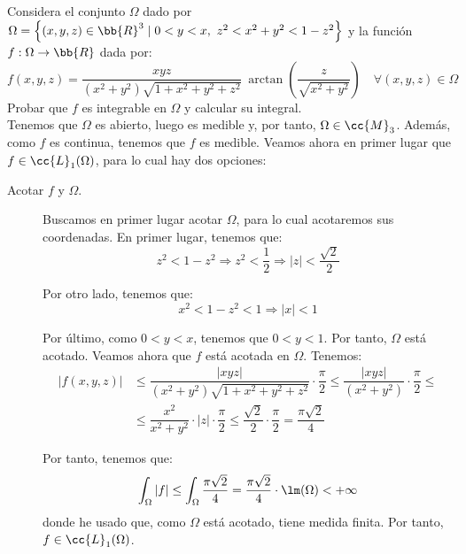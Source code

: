 \begin{ejercicio}
    Considera el conjunto $\Omega$ dado por $\Omega=\left\{(x,y,z)\in \bb{R}^3 \mid 0<y<x,~z^2<x^2+y^2<1-z^2\right\}$ y la función $f:\Omega\to \bb{R}$ dada por:
    \begin{equation*}
        f(x,y,z) = \dfrac{xyz}{(x^2+y^2)\sqrt{1+x^2+y^2+z^2}} ~\arctan\left(\dfrac{z}{\sqrt{x^2+y^2}}\right) \quad \forall (x,y,z)\in \Omega
    \end{equation*}
    Probar que $f$ es integrable en $\Omega$ y calcular su integral.\\

    Tenemos que $\Omega$ es abierto, luego es medible y, por tanto, $\Omega\in \cc{M}_3$. Además, como $f$ es continua, tenemos que $f$ es medible. Veamos ahora en primer lugar que $f\in \cc{L}_1(\Omega)$, para lo cual hay dos opciones:
    \begin{description}
        \item[Acotar $f$ y $\Omega$.]
        
        Buscamos en primer lugar acotar $\Omega$, para lo cual acotaremos sus coordenadas. En primer lugar, tenemos que:
        \begin{equation*}
            z^2<1-z^2\Longrightarrow z^2<\dfrac{1}{2}\Longrightarrow |z|<\dfrac{\sqrt{2}}{2}
        \end{equation*}

        Por otro lado, tenemos que:
        \begin{equation*}
            x^2<1-z^2<1\Longrightarrow |x|<1
        \end{equation*}

        Por último, como $0<y<x$, tenemos que $0<y<1$. Por tanto, $\Omega$ está acotado. Veamos ahora que $f$ está acotada en $\Omega$. Tenemos:
        \begin{align*}
            |f(x,y,z)| &\leq \dfrac{|xyz|}{(x^2+y^2)\sqrt{1+x^2+y^2+z^2}} \cdot \dfrac{\pi}{2} \leq \dfrac{|xyz|}{(x^2+y^2)}\cdot \dfrac{\pi}{2}
            \leq\\&\leq \dfrac{x^2}{x^2+y^2}\cdot |z| \cdot \dfrac{\pi}{2} \leq \dfrac{\sqrt{2}}{2}\cdot \dfrac{\pi}{2} = \dfrac{\pi\sqrt{2}}{4}
        \end{align*}

        Por tanto, tenemos que:
        \begin{equation*}
            \int_\Omega |f|\leq \int_\Omega \dfrac{\pi\sqrt{2}}{4} = \dfrac{\pi\sqrt{2}}{4} \cdot \lm(\Omega) < +\infty
        \end{equation*}
        donde he usado que, como $\Omega$ está acotado, tiene medida finita. Por tanto, $f\in \cc{L}_1(\Omega)$.


\end{description}
\end{ejercicio}
